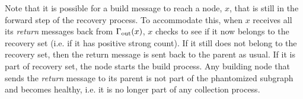 Note that it is possible for a build message to reach a node, $x$, that is still in
the forward step of the recovery process.  To accommodate this, when $x$
receives all its \emph{return} messages back from $\Gamma_{\rm out}(x)$,
$x$ checks to see if it now belongs to the recovery set (i.e. if it has positive strong
count). If it still does not belong to the recovery set, then the return
message is sent back to the parent as usual. If it is part of recovery set, the
node starts the build process. Any building node that sends the
\emph{return} message to its parent is not part of the phantomized subgraph and becomes
healthy, i.e. it is no longer part of any collection process.






